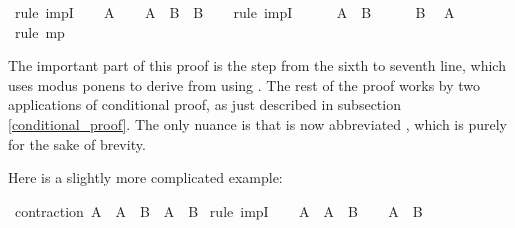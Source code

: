 \begin{isabellebody}
%
\isadelimproof
%
\endisadelimproof
%
\isatagproof
{}\isamarkupfalse%
\ {\isacharparenleft}rule\ impI{\isacharparenright}\isanewline
\ \ \isamarkupfalse%
\ {\isachardoublequoteopen}A{\isachardoublequoteclose}\isanewline
\ \ \isamarkupfalse%
\ {\isachardoublequoteopen}{\isacharparenleft}A\ {\isasymlongrightarrow}\ B{\isacharparenright}\ {\isasymlongrightarrow}\ B{\isachardoublequoteclose}\isanewline
\ \ \isamarkupfalse%
\ {\isacharparenleft}rule\ impI{\isacharparenright}\isanewline
\ \ \ \ \isamarkupfalse%
\ {\isachardoublequoteopen}A\ {\isasymlongrightarrow}\ B{\isachardoublequoteclose}\isanewline
\ \ \ \ \isamarkupfalse%
\ {\isachardoublequoteopen}B{\isachardoublequoteclose}\ \isamarkupfalse%
\ {\isacharbackquoteopen}A{\isacharbackquoteclose}\ \isamarkupfalse%
\ {\isacharparenleft}rule\ mp{\isacharparenright}\isanewline
\ \ \isamarkupfalse%
\isanewline
{}\isamarkupfalse%
%
\endisatagproof
{\isafoldproof}%
%
\isadelimproof
%
\endisadelimproof
%
\begin{isamarkuptext}%
The important part of this proof is the step from the sixth to seventh line, which uses
modus ponens to derive  from  using . The rest of the proof
works by two applications of conditional proof, as just described in subsection \ref{conditional_proof}.
The only nuance is that  is now abbreviated , which is purely for
the sake of brevity.%
\end{isamarkuptext}\isamarkuptrue%
%
\begin{isamarkuptext}%
Here is a slightly more complicated example:%
\end{isamarkuptext}\isamarkuptrue%
\isamarkupfalse%
\ contraction{\isacharcolon}\ {\isachardoublequoteopen}{\isacharparenleft}A\ {\isasymlongrightarrow}\ A\ {\isasymlongrightarrow}\ B{\isacharparenright}\ {\isasymlongrightarrow}\ {\isacharparenleft}A\ {\isasymlongrightarrow}\ B{\isacharparenright}{\isachardoublequoteclose}\isanewline
%
\isadelimproof
%
\endisadelimproof
%
\isatagproof
{}\isamarkupfalse%
\ {\isacharparenleft}rule\ impI{\isacharparenright}\isanewline
\ \ \isamarkupfalse%
\ {\isachardoublequoteopen}A\ {\isasymlongrightarrow}\ A\ {\isasymlongrightarrow}\ B{\isachardoublequoteclose}\isanewline
\ \ \isamarkupfalse%
\ {\isachardoublequoteopen}A\ {\isasymlongrightarrow}\ B{\isachardoublequoteclose}%

\end{isabellebody}

